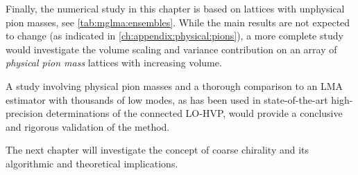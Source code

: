 Finally, the numerical study in this chapter is based on lattices with unphysical pion masses, see \cref{tab:mglma:ensembles}.
While the main results are not expected to change (as indicated in \cref{ch:appendix:physical:pions}), a more complete study would investigate the volume scaling and variance contribution on an array of \emph{physical pion mass} lattices with increasing volume.

A study involving physical pion masses and a thorough comparison to an LMA estimator with thousands of low modes, as has been used in state-of-the-art high-precision determinations of the connected LO-HVP, would provide a conclusive and rigorous validation of the method.

The next chapter will investigate the concept of coarse chirality and its algorithmic and theoretical implications.



